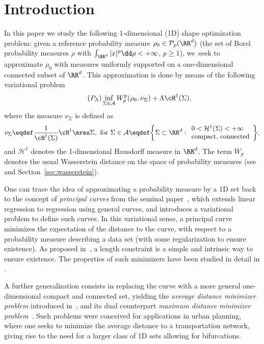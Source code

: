 \section{Introduction}\label{section.introduction}
In this paper we study the following 1-dimensional (1D) shape optimization
problem: given a reference probability measure
$\rho_0 \in \mathcal{P}_p(\RR^d)$ (the set of
Borel probability measures $\rho$ with $\int_{\RR^d}|x|^p \dd \rho<+\infty$, $p\ge 1$), we~seek to approximate $\rho_0$ with measures uniformly supported on a one-dimensional connected subset of $\RR^d$.
This approximation is done by means of the following variational problem
\begin{equation}
\label{problem.shape_optimization}
\tag{$P_\Lambda$}
\inf_{\Sigma \in \mathcal{A}}
W_p^p(\rho_0, \nu_{\Sigma}) + \Lambda \cH^1(\Sigma),
\end{equation}
where the measure $\nu_{\Sigma}$ is defined as
\begin{equation}\label{admissible_set}
\nu_{\Sigma} \eqdef \frac{1}{\cH^1(\Sigma)} \cH^1\mres \Sigma, \text{ for } \Sigma \in
\mathcal{A}\eqdef
\biggl\{
\Sigma \subset \RR^d :
\begin{array}{l}
0 < \mathcal{H}^1(\Sigma) < +\infty \\
\text{compact, connected}
\end{array}
\biggr\},
\end{equation}
and $\mathcal{H}^1$ denotes the 1-dimensional Hausdorff measure in $\RR^d$. The term $W_p$ denotes the usual Wasserstein distance on the space of probability measures (see~\cite{santambrogio2015optimal,villani2009optimal}
and Section~\ref{sec:wasserstein}).

One can trace the idea of approximating a probability measure by a 1D set back to the concept of \textit{principal curves} from the seminal paper~\cite{hastie1989principal}, which extends linear regression to regression using general curves, and introduces a variational problem to define such curves.
In this variational sense, a principal curve minimizes the expectation of the distance to the curve, with respect to a probability measure describing a data set (with some regularization to ensure existence). As proposed in~\cite{kegl2000learning}, a length constraint is a simple and intrinsic way to ensure existence. The properties of such minimizers have been studied in detail in \eg \cite{lu2016average,delattre2020principal}.

A further generalization consists in replacing the curve with a more general one-dimensional compact and connected set, yielding the \textit{average distance minimizer problem} introduced in~\cite{buttazzo2003optimal}, and its dual counterpart \textit{maximum distance minimizer problem}~\cite{paolini2004qualitative,lemenant2010presentation}. Such problems were conceived for applications in urban planning, where one seeks to minimize the average distance to a transportation network, giving rise to the need for a larger class of 1D sets allowing for bifurcations.

